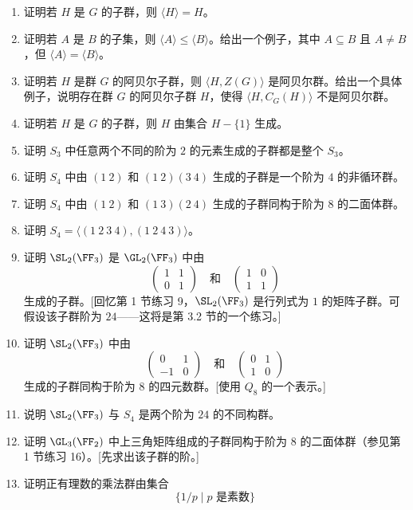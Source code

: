 \begin{enumerate}[label=\arabic*.]
  \item 证明若 $H$ 是 $G$ 的子群，则 $\langle H\rangle=H$。
  \item 证明若 $A$ 是 $B$ 的子集，则 $\langle A\rangle\leq\langle B\rangle$。给出一个例子，其中 $A\subseteq B$ 且 $A\neq B$，但 $\langle A\rangle=\langle B\rangle$。
  \item 证明若 $H$ 是群 $G$ 的阿贝尔子群，则 $\langle H,Z(G)\rangle$ 是阿贝尔群。给出一个具体例子，说明存在群 $G$ 的阿贝尔子群 $H$，使得 $\langle H,C_G(H)\rangle$ 不是阿贝尔群。
  \item 证明若 $H$ 是 $G$ 的子群，则 $H$ 由集合 $H-\{1\}$ 生成。
  \item 证明 $S_3$ 中任意两个不同的阶为 $2$ 的元素生成的子群都是整个 $S_3$。
  \item 证明 $S_4$ 中由 $(1\ 2)$ 和 $(1\ 2)(3\ 4)$ 生成的子群是一个阶为 $4$ 的非循环群。
  \item 证明 $S_4$ 中由 $(1\ 2)$ 和 $(1\ 3)(2\ 4)$ 生成的子群同构于阶为 $8$ 的二面体群。
  \item 证明 $S_4=\langle(1\ 2\ 3\ 4),(1\ 2\ 4\ 3)\rangle$。
  \item 证明 $\SL_2(\FF_3)$ 是 $\GL_2(\FF_3)$ 中由
  \[
    \begin{pmatrix}1&1\\0&1\end{pmatrix}
    \quad\text{和}\quad
    \begin{pmatrix}1&0\\1&1\end{pmatrix}
  \]
  生成的子群。[回忆第 1 节练习 9，$\SL_2(\FF_3)$ 是行列式为 $1$ 的矩阵子群。可假设该子群阶为 $24$——这将是第 3.2 节的一个练习。]
  \item 证明 $\SL_2(\FF_3)$ 中由
  \[
    \begin{pmatrix}0&1\\-1&0\end{pmatrix}
    \quad\text{和}\quad
    \begin{pmatrix}0&1\\1&0\end{pmatrix}
  \]
  生成的子群同构于阶为 $8$ 的四元数群。[使用 $Q_8$ 的一个表示。]
  \item 说明 $\SL_2(\FF_3)$ 与 $S_4$ 是两个阶为 $24$ 的不同构群。
  \item 证明 $\GL_3(\FF_2)$ 中上三角矩阵组成的子群同构于阶为 $8$ 的二面体群（参见第 1 节练习 16）。[先求出该子群的阶。]
  \item 证明正有理数的乘法群由集合
  \[
    \{1/p\mid p\text{ 是素数}\}
\]
\end{enumerate}
